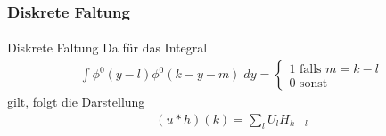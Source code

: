 \documentclass{beamer}
\begin{document}
\begin{frame}
    \frametitle{Diskrete Faltung}
\framesubtitle{}

    \begin{block}{Diskrete Faltung}
Da für das Integral 
\begin{align*}
  \int  \phi^0(y-l) \phi^0(k-y-m)  \; dy  = \begin{cases}
1 \text{ falls } m = k -l\\
0 \text{ sonst }
\end{cases}
\end{align*}
gilt, folgt die Darstellung
\begin{align*}
 (u  * h)(k) = \sum_l U_l H_{k-l}
\end{align*}

\end{block}

 \end{frame}
\end{document}
